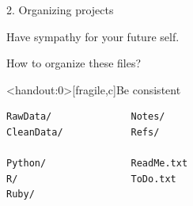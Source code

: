 \documentclass[12pt,t]{beamer}
\begin{document}
\begin{frame}[c]{2. Organizing projects}

\begin{center}
\large
Have sympathy for your future self.
\end{center}


\end{frame}




\begin{frame}[c]{How to organize these files?}

\vspace{5mm}


\end{frame}




\begin{frame}<handout:0>[fragile,c]{Be consistent}


\begin{center}
\begin{minipage}[c]{10.3cm}
\begin{semiverbatim}
\lstset{basicstyle=\normalsize}
\begin{lstlisting}[linewidth=10.3cm]
RawData/              Notes/
CleanData/            Refs/

Python/               ReadMe.txt
R/                    ToDo.txt
Ruby/
\end{lstlisting}
\end{semiverbatim}
\end{minipage}
\end{center}

\end{frame}
\end{document}
